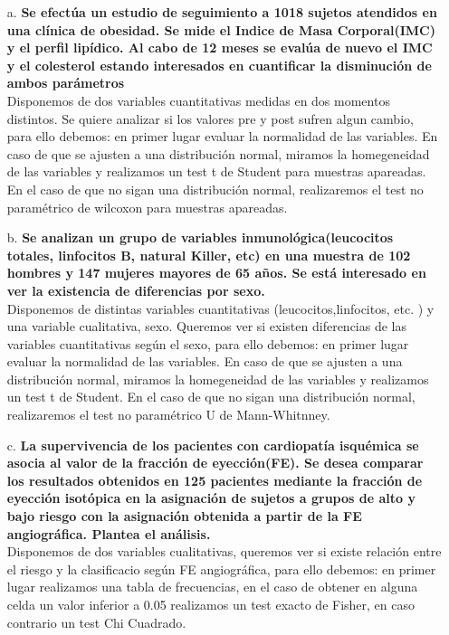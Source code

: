 \documentclass[10pt]{extarticle}\usepackage[]{graphicx}\usepackage[]{color}
\begin{document}
\begin{enumerate}
  \item [a.] \textbf{Se efectúa un estudio de seguimiento a 1018 sujetos atendidos en una clínica de obesidad. Se mide el Indice de Masa Corporal(IMC) y el perfil lipídico. Al cabo de 12 meses se evalúa de nuevo el IMC y el colesterol estando interesados en cuantificar la disminución de ambos parámetros}\\
  
  Disponemos de dos variables cuantitativas medidas en dos momentos distintos. Se quiere analizar si los valores pre y post sufren algun cambio, para ello debemos: en primer lugar evaluar la normalidad de las variables. En caso de que se ajusten a una distribución normal, miramos la homegeneidad de las variables y realizamos un test t de Student para muestras apareadas. En el caso de que no sigan una distribución normal, realizaremos el test no paramétrico de wilcoxon para muestras apareadas. 

  \item [b.] \textbf{Se analizan un grupo de variables inmunológica(leucocitos totales, linfocitos B, natural Killer, etc) en una muestra de 102 hombres y 147 mujeres mayores de 65 años. Se está interesado en ver la existencia de diferencias por sexo.}\\
  
  Disponemos de distintas variables cuantitativas (leucocitos,linfocitos, etc. ) y una variable cualitativa, sexo. Queremos ver si existen diferencias de las variables cuantitativas según el sexo, para ello debemos: en primer lugar evaluar la normalidad de las variables. En caso de que se ajusten a una distribución normal, miramos la homegeneidad de las variables y realizamos un test t de Student. En el caso de que no sigan una distribución normal, realizaremos el test no paramétrico U de Mann-Whitnney. 

  \item [c.] \textbf{La supervivencia de los pacientes con cardiopatía isquémica se asocia al valor de la fracción de eyección(FE). Se desea comparar los resultados obtenidos en 125 pacientes mediante la fracción de eyección isotópica en la asignación de sujetos a grupos de alto y bajo riesgo con la asignación obtenida a partir de la FE angiográfica. Plantea el análisis.}\\

Disponemos de dos variables cualitativas, queremos ver si existe relación entre el riesgo y la clasificacio según FE angiográfica, para ello debemos: en primer lugar realizamos una tabla de frecuencias, en el caso de obtener en alguna celda un valor inferior a 0.05 realizamos un test exacto de Fisher, en caso contrario un test Chi Cuadrado. 

\end{enumerate}
\end{document}
